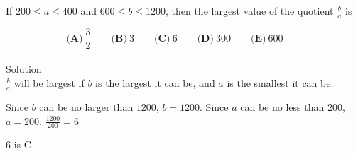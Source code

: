 

If $ 200 \le a \le 400$ and $ 600 \le b \le 1200$, then the largest value of the quotient $ \frac{b}{a}$ is

\[ \textbf{(A)}\ \frac{3}{2} \qquad
\textbf{(B)}\ 3 \qquad
\textbf{(C)}\ 6 \qquad
\textbf{(D)}\ 300 \qquad
\textbf{(E)}\ 600 \qquad
\]
\\
Solution
\\
$\frac{b}{a}$ will be largest if $b$ is the largest it can be, and $a$ is the smallest it can be.

Since $b$ can be no larger than $1200$, $b = 1200$. Since $a$ can be no less than $200$, $a = 200$. $\frac{1200}{200} = 6$

$6$ is $\boxed{\text{C}}$